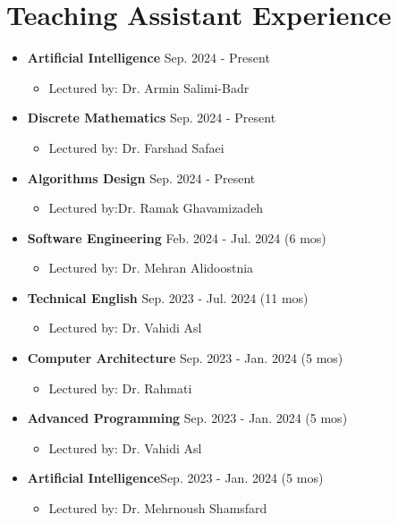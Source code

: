 \documentclass[11pt,a4paper,sans]{moderncv}        %
\begin{document}
\section{Teaching Assistant Experience}
\begin{itemize}

    \item \textbf{Artificial Intelligence } \hfill Sep. 2024 - Present
\begin{itemize}
        \item Lectured by: Dr. Armin Salimi-Badr

    \end{itemize}
\item \textbf{Discrete Mathematics } \hfill Sep. 2024 - Present
\begin{itemize}
        \item Lectured by: Dr. Farshad Safaei


    \end{itemize}

\item \textbf{Algorithms Design } \hfill Sep. 2024 - Present
\begin{itemize}
        \item Lectured by:Dr. Ramak Ghavamizadeh


    \end{itemize}
    \item \textbf{Software Engineering } \hfill Feb. 2024 - Jul. 2024 (6 mos)
    \begin{itemize}
        \item Lectured by: Dr. Mehran Alidoostnia
    \end{itemize}

    \item \textbf{Technical English} \hfill Sep. 2023 - Jul. 2024 (11 mos)
    \begin{itemize}
        \item Lectured by: Dr. Vahidi Asl

    \end{itemize}

    \item \textbf{Computer Architecture} \hfill Sep. 2023 - Jan. 2024 (5 mos)
    \begin{itemize}
        \item Lectured by: Dr. Rahmati
    \end{itemize}

    \item \textbf{Advanced Programming} \hfill Sep. 2023 - Jan. 2024 (5 mos)
    \begin{itemize}
        \item Lectured by: Dr. Vahidi Asl
    \end{itemize}
\newpage
    \item \textbf{Artificial Intelligence}\hfill Sep. 2023 - Jan. 2024 (5 mos)
    \begin{itemize}
        \item Lectured by: Dr. Mehrnoush Shamsfard
    \end{itemize}


\end{itemize}
\end{document}
